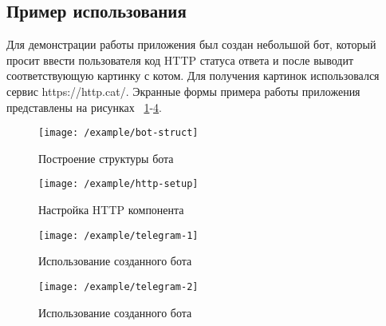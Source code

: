 
\newpage

\subsection{Пример использования}


Для демонстрации работы приложения был создан небольшой бот, который
просит ввести пользователя код HTTP статуса ответа и после выводит соответствующую картинку
с котом. Для получения картинок использовался сервис https://http.cat/.
Экранные формы примера работы приложения представлены на рисунках~
\ref{f:example:bot-struct}-\ref{f:example:telegram-2}.

\begin{figure}[H]
	\centering
	\texttt{[image: /example/bot-struct]}
	\caption{Построение структуры бота}
	\label{f:example:bot-struct}
\end{figure}


\begin{figure}[H]
	\centering
	\texttt{[image: /example/http-setup]}
	\caption{Настройка HTTP компонента}
	\label{f:example:http-setup}
\end{figure}

\begin{figure}[H]
	\centering
	\texttt{[image: /example/telegram-1]}
	\caption{Использование созданного бота}
	\label{f:example:telegram-1}
\end{figure}


\begin{figure}[H]
	\centering
	\texttt{[image: /example/telegram-2]}
	\caption{Использование созданного бота}
	\label{f:example:telegram-2}
\end{figure}

